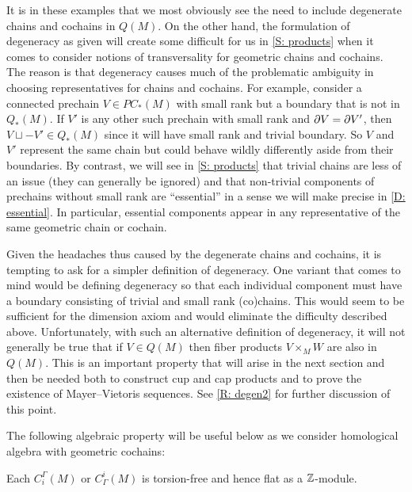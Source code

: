 \begin{remark}\label{R: degen1}
	It is in these examples that we most obviously see the need to include degenerate chains and cochains in $Q(M)$.
	On the other hand, the formulation of degeneracy as given will create some difficult for us in \cref{S: products} when it comes to consider notions of transversality for geometric chains and cochains.
	The reason is that degeneracy causes much of the problematic ambiguity in choosing representatives for chains and cochains.
	For example, consider a connected prechain $V \in PC_*(M)$ with small rank but a boundary that is not in $Q_*(M)$.
	If $V'$ is any other such prechain with small rank and $\partial V = \partial V'$, then $V \sqcup -V' \in Q_*(M)$ since it will have small rank and trivial boundary.
	So $V$ and $V'$ represent the same chain but could behave wildly differently aside from their boundaries.
	By contrast, we will see in \cref{S: products} that trivial chains are less of an issue (they can generally be ignored) and that non-trivial components of prechains without small rank are ``essential'' in a sense we will make precise in \cref{D: essential}.
	In particular, essential components appear in any representative of the same geometric chain or cochain.

	Given the headaches thus caused by the degenerate chains and cochains, it is tempting to ask for a simpler definition of degeneracy.
	One variant that comes to mind would be defining degeneracy so that each individual component must have a boundary consisting of trivial and small rank (co)chains.
	This would seem to be sufficient for the dimension axiom and would eliminate the difficulty described above.
	Unfortunately, with such an alternative definition of degeneracy, it will not generally be true that if $V \in Q(M)$ then fiber products $V \times_M W$ are also in $Q(M)$.
	This is an important property that will arise in the next section and then be needed both to construct cup and cap products and to prove the existence of Mayer--Vietoris sequences.
	See \cref{R: degen2} for further discussion of this point.
\end{remark}

The following algebraic property will be useful below as we consider homological algebra with geometric cochains:

\begin{lemma}
	Each $C_i^\Gamma(M)$ or $C_\Gamma^i(M)$ is torsion-free and hence flat as a $\mathbb{Z}$-module.
\end{lemma}

